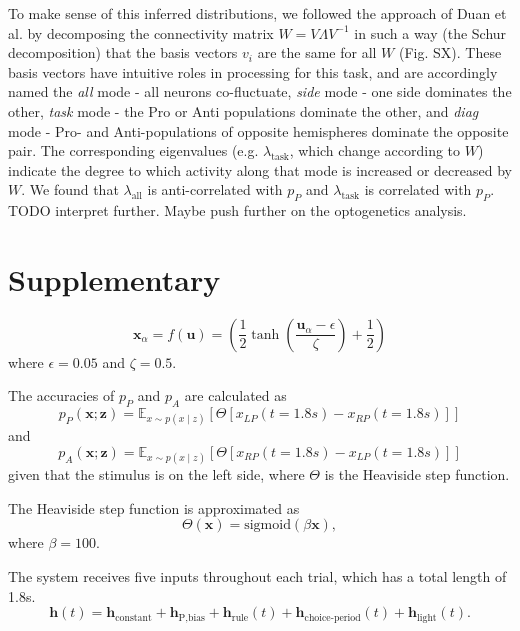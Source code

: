 \documentclass[11pt]{article}
\begin{document}
To make sense of this inferred distributions, we followed the approach of Duan et al. by decomposing the connectivity matrix $W = V\Lambda V^{-1}$ in such a way (the Schur decomposition) that the basis vectors $v_i$ are the same for all $W$ (Fig. SX). 
These basis vectors have intuitive roles in processing for this task, and are accordingly named the \textit{all} mode - all neurons co-fluctuate, \textit{side} mode - one side dominates the other, \textit{task} mode - the Pro or Anti populations dominate the other, and \textit{diag} mode - Pro- and Anti-populations of opposite hemispheres dominate the opposite pair. 
The corresponding eigenvalues (e.g. $\lambda_{\text{task}}$, which change according to $W$) indicate the degree to which activity along that mode is increased or decreased by $W$. 
We found that $\lambda_{\text{all}}$ is anti-correlated with $p_P$ and $\lambda_{\text{task}}$ is correlated with $p_P$.
TODO interpret further.  Maybe push further on the optogenetics analysis.

\section{Supplementary}\label{methods_SC}
\begin{equation}
\mathbf{x}_\alpha = f(\mathbf{u}) = \left(\frac{1}{2}\tanh\left(\frac{\mathbf{u}_\alpha - \epsilon}{\zeta}\right)+ \frac{1}{2} \right)
\end{equation}
where $\epsilon = 0.05$ and $\zeta = 0.5$.  

The accuracies of $p_P$ and $p_A$ are calculated as
\begin{equation}
p_P(\mathbf{x}; \mathbf{z}) = \mathbb{E}_{x \sim p(x \mid z)}\left[\Theta[x_{LP}(t=1.8s) - x_{RP}(t=1.8s)]\right]
\end{equation}
and 
\begin{equation}
p_A(\mathbf{x}; \mathbf{z}) = \mathbb{E}_{x \sim p(x \mid z)}\left[\Theta[x_{RP}(t=1.8s) - x_{LP}(t=1.8s)]\right]
\end{equation}
given that the stimulus is on the left side, where $\Theta$ is the Heaviside step function.

The Heaviside step function is approximated as
\begin{equation}
\Theta(\mathbf{x}) = \text{sigmoid}(\beta \mathbf{x}),
\end{equation}
where $\beta = 100$.

The system receives five inputs throughout each trial, which has a total length of 1.8s.
\begin{equation}
\mathbf{h}(t) = \mathbf{h}_{\text{constant}} + \mathbf{h}_{\text{P,bias}} + \mathbf{h}_{\text{rule}}(t) + \mathbf{h}_{\text{choice-period}}(t) + \mathbf{h}_{\text{light}}(t).
\end{equation}
\end{document}
